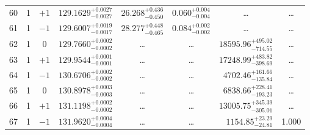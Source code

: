 \begin{table*}[!]
\begin{tabular}{llcrrlrc}
60 & 1 & $+1$ & $    129.1629_{-      0.0027}^{+      0.0027}$ & $      26.268_{-       0.450}^{+       0.436}$ & $       0.060_{-       0.004}^{+       0.004}$ & \multicolumn{1}{c}{\dots} & \dots\\[1pt]
61 & 1 & $-1$ & $    129.6007_{-      0.0017}^{+      0.0019}$ & $      28.277_{-       0.465}^{+       0.448}$ & $       0.084_{-       0.002}^{+       0.002}$ & \multicolumn{1}{c}{\dots} & \dots\\[1pt]
62 & 1 & 0 & $    129.7660_{-      0.0002}^{+      0.0002}$ & \multicolumn{1}{c}{\dots} & \multicolumn{1}{c}{\dots} & $    18595.96_{-      714.55}^{+      495.02}$ & \dots\\[1pt]
63 & 1 & $+1$ & $    129.9544_{-      0.0001}^{+      0.0001}$ & \multicolumn{1}{c}{\dots} & \multicolumn{1}{c}{\dots} & $    17248.99_{-      398.69}^{+      483.82}$ & \dots\\[1pt]
64 & 1 & $-1$ & $    130.6706_{-      0.0002}^{+      0.0002}$ & \multicolumn{1}{c}{\dots} & \multicolumn{1}{c}{\dots} & $     4702.46_{-      135.84}^{+      161.66}$ & \dots\\[1pt]
65 & 1 & 0 & $    130.8978_{-      0.0003}^{+      0.0003}$ & \multicolumn{1}{c}{\dots} & \multicolumn{1}{c}{\dots} & $     6838.66_{-      193.23}^{+      228.41}$ & \dots\\[1pt]
66 & 1 & $+1$& $    131.1198_{-      0.0002}^{+      0.0002}$ & \multicolumn{1}{c}{\dots} & \multicolumn{1}{c}{\dots} & $    13005.75_{-      305.01}^{+      345.39}$ & \dots \\[1pt]
67 & 1 & $-1$ & $    131.9620_{-      0.0004}^{+      0.0004}$ & \multicolumn{1}{c}{\dots} & \multicolumn{1}{c}{\dots} & $     1154.85_{-       24.81}^{+       23.29}$ & 1.000\\[1pt]


\end{tabular}
\end{table*}
